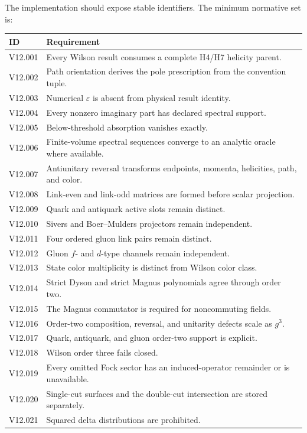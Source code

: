 \documentclass[11pt]{article}
\newcommand{\eps}{\varepsilon}
\begin{document}
The implementation should expose stable identifiers.  The minimum normative
set is:
\begin{longtable}{L{0.17\textwidth}L{0.75\textwidth}}
\toprule
ID & Requirement\\
\midrule
\endhead
V12.001 & Every Wilson result consumes a complete H4/H7 helicity parent.\\
V12.002 & Path orientation derives the pole prescription from the convention tuple.\\
V12.003 & Numerical \(\eps\) is absent from physical result identity.\\
V12.004 & Every nonzero imaginary part has declared spectral support.\\
V12.005 & Below-threshold absorption vanishes exactly.\\
V12.006 & Finite-volume spectral sequences converge to an analytic oracle where available.\\
V12.007 & Antiunitary reversal transforms endpoints, momenta, helicities, path, and color.\\
V12.008 & Link-even and link-odd matrices are formed before scalar projection.\\
V12.009 & Quark and antiquark active slots remain distinct.\\
V12.010 & Sivers and Boer--Mulders projectors remain independent.\\
V12.011 & Four ordered gluon link pairs remain distinct.\\
V12.012 & Gluon \(f\)- and \(d\)-type channels remain independent.\\
V12.013 & State color multiplicity is distinct from Wilson color class.\\
V12.014 & Strict Dyson and strict Magnus polynomials agree through order two.\\
V12.015 & The Magnus commutator is required for noncommuting fields.\\
V12.016 & Order-two composition, reversal, and unitarity defects scale as \(g^3\).\\
V12.017 & Quark, antiquark, and gluon order-two support is explicit.\\
V12.018 & Wilson order three fails closed.\\
V12.019 & Every omitted Fock sector has an induced-operator remainder or is unavailable.\\
V12.020 & Single-cut surfaces and the double-cut intersection are stored separately.\\
V12.021 & Squared delta distributions are prohibited.\\

\end{longtable}
\end{document}

